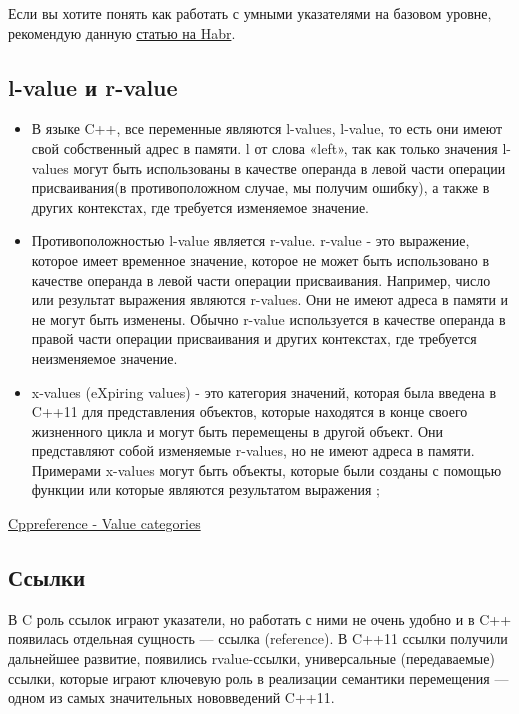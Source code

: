 Если вы хотите понять как работать с умными указателями на базовом уровне, рекомендую данную \href{https://habr.com/ru/companies/piter/articles/706866/}{статью на Habr}.

\subsection{l-value и r-value}

\begin{itemize}
    \item
          В языке C++, все переменные являются l-values, l-value, то есть они имеют свой собственный адрес в памяти. l от слова «left», так как только значения l-values могут быть использованы в качестве операнда в левой части операции присваивания(в противоположном случае, мы получим ошибку), а также в других контекстах, где требуется изменяемое значение.
    \item
          Противоположностью l-value является r-value. r-value - это выражение, которое имеет временное значение, которое не может быть использовано в качестве операнда в левой части операции присваивания. Например, число  или результат выражения  являются r-values. Они не имеют адреса в памяти и не могут быть изменены. Обычно r-value используется в качестве операнда в правой части операции присваивания и других контекстах, где требуется неизменяемое значение.
    \item
          x-values (eXpiring values) - это категория значений, которая была введена в C++11 для представления объектов, которые находятся в конце своего жизненного цикла и могут быть перемещены в другой объект. Они представляют собой изменяемые r-values, но не имеют адреса в памяти. Примерами x-values могут быть объекты, которые были созданы с помощью функции  или которые являются результатом выражения ;
\end{itemize}

\href{https://en.cppreference.com/w/cpp/language/value_category.html}{Cppreference - Value categories}

\subsection{Ссылки}

В C роль ссылок играют указатели, но работать с ними не очень удобно и в C++ появилась отдельная сущность — ссылка (reference). В C++11 ссылки получили дальнейшее развитие, появились rvalue-ссылки, универсальные (передаваемые) ссылки, которые играют ключевую роль в реализации семантики перемещения — одном из самых значительных нововведений C++11.

